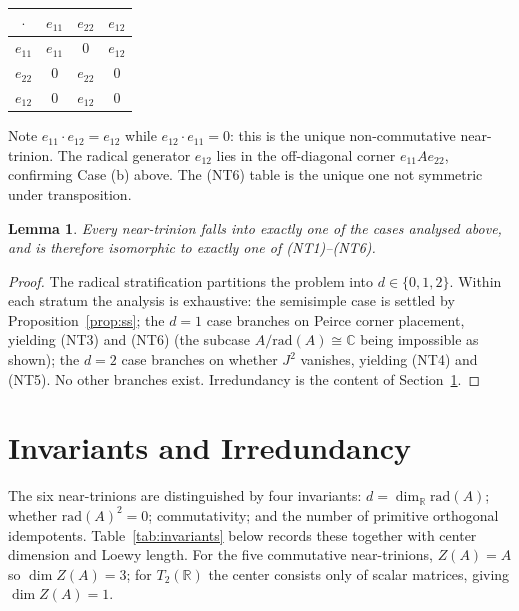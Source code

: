 \documentclass{amsart}
\theoremstyle{plain}
\newtheorem{lemma}[theorem]{Lemma}
\theoremstyle{definition}
\theoremstyle{remark}
\newcommand{\RR}{\mathbb{R}}
\newcommand{\CC}{\mathbb{C}}
\newcommand{\Jac}{\mathrm{rad}}
\begin{document}
\begin{center}
\renewcommand{\arraystretch}{1.2}
\begin{tabular}{c|ccc}
  $\cdot$ & $e_{11}$ & $e_{22}$ & $e_{12}$ \\\hline
  $e_{11}$ & $e_{11}$ & $0$      & $e_{12}$ \\
  $e_{22}$ & $0$      & $e_{22}$ & $0$ \\
  $e_{12}$ & $0$      & $e_{12}$ & $0$ \\
\end{tabular}
\end{center}
Note $e_{11} \cdot e_{12} = e_{12}$ while $e_{12} \cdot e_{11} = 0$:
this is the unique non-commutative near-trinion.
The radical generator $e_{12}$ lies in the off-diagonal corner
$e_{11}A e_{22}$, confirming Case (b) above.
The (NT6) table is the unique one not symmetric under transposition.

\begin{lemma}\label{lem:complete}
  Every near-trinion falls into exactly one of the cases analysed above,
  and is therefore isomorphic to exactly one of \textup{(NT1)}--\textup{(NT6)}.
\end{lemma}

\begin{proof}
  The radical stratification partitions the problem into $d \in \{0,1,2\}$.
  Within each stratum the analysis is exhaustive: the semisimple case is
  settled by Proposition~\ref{prop:ss}; the $d = 1$ case branches on
  Peirce corner placement, yielding (NT3) and (NT6) (the subcase
  $A/\Jac(A) \cong \CC$ being impossible as shown); the $d = 2$ case
  branches on whether $J^2$ vanishes, yielding (NT4) and (NT5).
  No other branches exist.
  Irredundancy is the content of Section~\ref{sec:invariants}.
\end{proof}

\section{Invariants and Irredundancy}\label{sec:invariants}

The six near-trinions are distinguished by four invariants:
$d = \dim_\RR \Jac(A)$; whether $\Jac(A)^2 = 0$; commutativity; and the
number of primitive orthogonal idempotents.
Table~\ref{tab:invariants} below records these together with center
dimension and Loewy length.
For the five commutative near-trinions, $Z(A) = A$ so $\dim Z(A) = 3$;
for $T_2(\RR)$ the center consists only of scalar matrices,
giving $\dim Z(A) = 1$.
\end{document}
